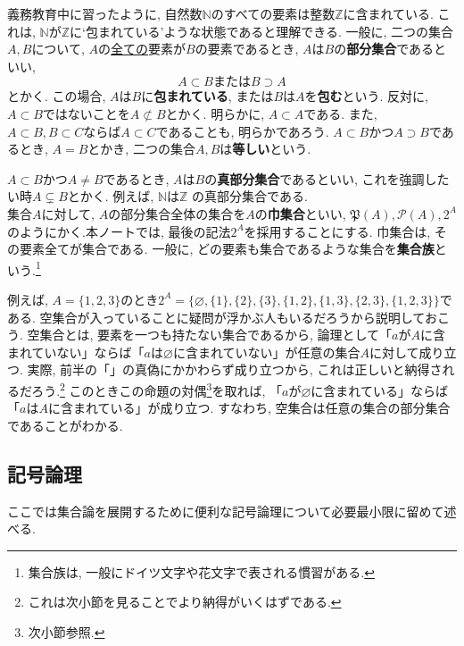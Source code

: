 \documentclass[a4j,dvipdfmx]{jsarticle}
\numberwithin{equation}{section}
\begin{document}
            義務教育中に習ったように, 自然数$\mathbb{N}$のすべての要素は整数$\mathbb{Z}$に含まれている. これは, $\mathbb{N}$が$\mathbb{Z}$に`包まれている'ような状態であると理解できる.
            一般に, 二つの集合$A,B$について, $A$の\underline{全ての}要素が$B$の要素であるとき, $A$は$B$の\textbf{部分集合}であるといい,
            \begin{equation}
                A \subset B \text{または} B \supset A \label{eq:集合論基礎:部分集合の表記}
            \end{equation} 
            とかく. この場合, $A$は$B$に\textbf{包まれている}, または$B$は$A$を\textbf{包む}という. 反対に, $A\subset B$ではないことを$A\not\subset B$とかく.
            明らかに, $A\subset A$である. また, $A\subset B,B\subset C$ならば$A\subset C$であることも, 明らかであろう. 
            $A\subset B$かつ$A \supset B$であるとき, $A=B$とかき, 二つの集合$A,B$は\textbf{等しい}という.

            $A\subset B$かつ$A\neq B$であるとき, $A$は$B$の\textbf{真部分集合}であるといい, これを強調したい時$A\subsetneq B$とかく. 例えば, $\mathbb{N}$は$\mathbb{Z}$
            の真部分集合である.\\

            集合$A$に対して, $A$の部分集合全体の集合を$A$の\textbf{巾集合}といい, $\mathfrak{P}(A), \mathcal{P}(A), 2^{A}$のようにかく.本ノートでは, 最後の記法$2^{A}$を採用することにする.
            巾集合は, その要素全てが集合である. 一般に, どの要素も集合であるような集合を\textbf{集合族}という.\footnote{集合族は, 一般にドイツ文字や花文字で表される慣習がある.}

            例えば, $A=\{1,2,3\}$のとき$2^{A}=\{\varnothing,\{1\},\{2\},\{3\},\{1,2\},\{1,3\},\{2,3\},\{1,2,3\}\}$である. 空集合が入っていることに疑問が浮かぶ人もいるだろうから説明しておこう.
            空集合とは, 要素を一つも持たない集合であるから, 論理として「$a$が$A$に含まれていない」ならば「$a$は$\varnothing$に含まれていない」が任意の集合$A$に対して成り立つ.
            実際, 前半の「」の真偽にかかわらず成り立つから, これは正しいと納得されるだろう.\footnote{これは次小節を見ることでより納得がいくはずである.} 
            このときこの命題の対偶\footnote{次小節参照.}を取れば, 「$a$が$\varnothing$に含まれている」ならば「$a$は$A$に含まれている」が成り立つ.
            すなわち, 空集合は任意の集合の部分集合であることがわかる. 
        \clearpage
        \subsection{記号論理}
            ここでは集合論を展開するために便利な記号論理について必要最小限に留めて述べる.
\end{document}

